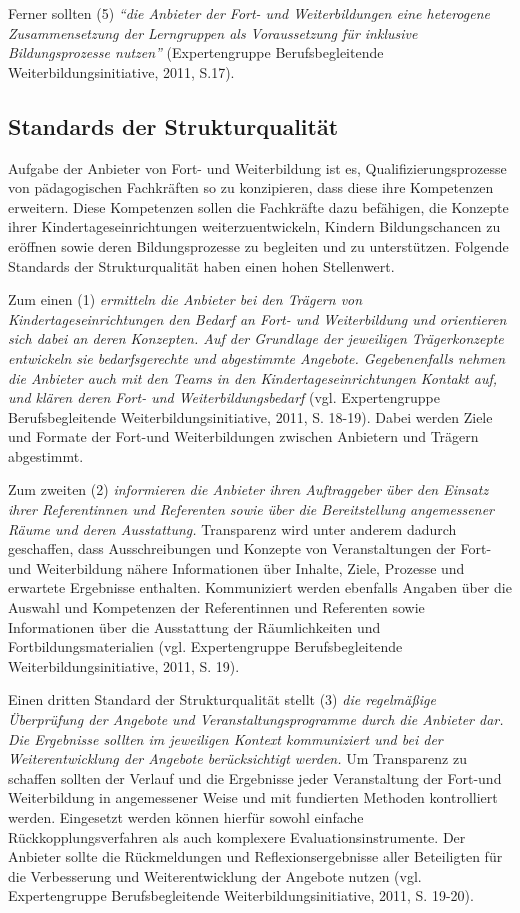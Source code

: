 \documentclass[12pt,a4paper]{article}
\begin{document}
Ferner sollten (5) \textit{"`die Anbieter der Fort- und Weiterbildungen eine heterogene Zusammensetzung der Lerngruppen als Voraussetzung für inklusive Bildungsprozesse nutzen"'} (Expertengruppe Berufsbegleitende Weiterbildungsinitiative, 2011, S.17).

 \subsection{Standards der Strukturqualität}
 
Aufgabe der Anbieter von Fort- und Weiterbildung ist es, Qua\-li\-fi\-zie\-rungs\-pro\-zes\-se von pädagogischen Fachkräften so zu konzipieren, dass diese ihre Kompetenzen erweitern. Diese Kompetenzen sollen die Fachkräfte dazu befähigen, die Konzepte ihrer Kindertageseinrichtungen weiterzuentwickeln, Kindern Bildungschancen zu eröffnen sowie deren Bildungsprozesse zu begleiten und zu unterstützen. Folgende Standards der Strukturqualität haben einen hohen Stellenwert. 

Zum einen (1) \textit{ermitteln die Anbieter bei den Trägern von Kindertageseinrichtungen den Bedarf an Fort- und Weiterbildung und orientieren sich dabei an deren Konzepten. Auf der Grundlage der jeweiligen Trägerkonzepte entwickeln sie bedarfsgerechte und abgestimmte Angebote. Gegebenenfalls nehmen die Anbieter auch mit den Teams in den Kindertageseinrichtungen Kontakt auf, und klären deren Fort- und Weiterbildungsbedarf} (vgl. Expertengruppe Berufsbegleitende Weiterbildungsinitiative, 2011, S. 18-19). Dabei werden Ziele und Formate der Fort-und Weiterbildungen zwischen Anbietern und Trägern abgestimmt.

Zum zweiten (2) \textit{informieren die Anbieter  ihren Auftraggeber über den Einsatz ihrer Referentinnen und Referenten sowie über die Bereitstellung angemessener Räume und deren Ausstattung.} Transparenz wird unter anderem dadurch geschaffen, dass Ausschreibungen und Konzepte von Veranstaltungen der Fort- und Weiterbildung nähere Informationen über Inhalte, Ziele, Prozesse und erwartete Ergebnisse enthalten. Kommuniziert werden ebenfalls Angaben über die Auswahl und Kompetenzen der Referentinnen und Referenten sowie Informationen über die Ausstattung der Räumlichkeiten und Fortbildungsmaterialien (vgl. Expertengruppe Berufsbegleitende Weiterbildungsinitiative, 2011, S. 19). 

Einen dritten Standard der Strukturqualität stellt (3) \textit{die regelmäßige Überprüfung der Angebote und Veranstaltungsprogramme durch die Anbieter dar. Die Er\-geb\-nis\-se sollten im jeweiligen Kontext kommuniziert und bei der Weiterentwicklung der Angebote berücksichtigt werden. }Um Transparenz zu schaffen sollten der Verlauf und die Ergebnisse jeder Veranstaltung der Fort-und Weiterbildung in angemessener Weise und mit fundierten Methoden kontrolliert werden. Eingesetzt werden können hierfür sowohl einfache Rück\-kopp\-lungs\-ver\-fahr\-en als auch komplexere Evaluationsinstrumente. Der Anbieter sollte die Rück\-mel\-dung\-en und Reflexionsergebnisse aller Beteiligten für die Ver\-bes\-ser\-ung und Weiterentwicklung der Angebote nutzen (vgl. Expertengruppe Berufsbegleitende Weiterbildungsinitiative, 2011, S. 19-20). 
\end{document}
